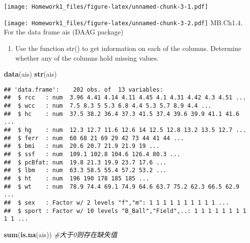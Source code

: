 \documentclass[hyperref,]{ctexart}
\newenvironment{Shaded}{\begin{snugshade}}{\end{snugshade}}
\newcommand{\CommentTok}[1]{\textcolor[rgb]{0.56,0.35,0.01}{\textit{#1}}}
\newcommand{\KeywordTok}[1]{\textcolor[rgb]{0.13,0.29,0.53}{\textbf{#1}}}
\newcommand{\NormalTok}[1]{#1}
\newcommand{\OperatorTok}[1]{\textcolor[rgb]{0.81,0.36,0.00}{\textbf{#1}}}
\providecommand{\tightlist}{%
  \setlength{\itemsep}{0pt}\setlength{\parskip}{0pt}}
\begin{document}
\texttt{[image: Homework1\_files/figure-latex/unnamed-chunk-3-1.pdf]}

\begin{Shaded}
\end{Shaded}

\texttt{[image: Homework1\_files/figure-latex/unnamed-chunk-3-2.pdf]}
MB.Ch1.4. For the data frame ais (DAAG package)

\begin{enumerate}
\def\labelenumi{(\alph{enumi})}
\tightlist
\item
  Use the function str() to get information on each of the columns.
  Determine whether any of the columns hold missing values.
\end{enumerate}

\begin{Shaded}
\begin{Highlighting}[]
\KeywordTok{data}\NormalTok{(ais)}
\KeywordTok{str}\NormalTok{(ais)}
\end{Highlighting}
\end{Shaded}

\begin{verbatim}
## 'data.frame':    202 obs. of  13 variables:
##  $ rcc   : num  3.96 4.41 4.14 4.11 4.45 4.1 4.31 4.42 4.3 4.51 ...
##  $ wcc   : num  7.5 8.3 5 5.3 6.8 4.4 5.3 5.7 8.9 4.4 ...
##  $ hc    : num  37.5 38.2 36.4 37.3 41.5 37.4 39.6 39.9 41.1 41.6 ...
##  $ hg    : num  12.3 12.7 11.6 12.6 14 12.5 12.8 13.2 13.5 12.7 ...
##  $ ferr  : num  60 68 21 69 29 42 73 44 41 44 ...
##  $ bmi   : num  20.6 20.7 21.9 21.9 19 ...
##  $ ssf   : num  109.1 102.8 104.6 126.4 80.3 ...
##  $ pcBfat: num  19.8 21.3 19.9 23.7 17.6 ...
##  $ lbm   : num  63.3 58.5 55.4 57.2 53.2 ...
##  $ ht    : num  196 190 178 185 185 ...
##  $ wt    : num  78.9 74.4 69.1 74.9 64.6 63.7 75.2 62.3 66.5 62.9 ...
##  $ sex   : Factor w/ 2 levels "f","m": 1 1 1 1 1 1 1 1 1 1 ...
##  $ sport : Factor w/ 10 levels "B_Ball","Field",..: 1 1 1 1 1 1 1 1 1 1 ...
\end{verbatim}

\begin{Shaded}
\begin{Highlighting}[]
\KeywordTok{sum}\NormalTok{(}\KeywordTok{is.na}\NormalTok{(ais)) }\CommentTok{#大于0则存在缺失值}
\end{Highlighting}
\end{Shaded}
\end{document}
